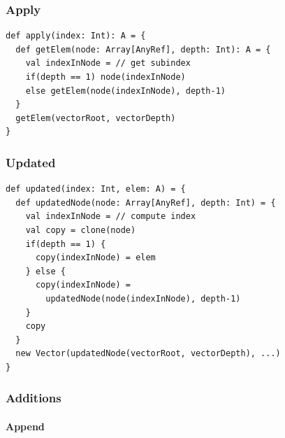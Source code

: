
\subsubsection{Apply}

\begin{lstlisting}[frame=single]
def apply(index: Int): A = {
  def getElem(node: Array[AnyRef], depth: Int): A = {
    val indexInNode = // get subindex
    if(depth == 1) node(indexInNode)
    else getElem(node(indexInNode), depth-1) 
  }
  getElem(vectorRoot, vectorDepth)
}
\end{lstlisting}


\subsubsection{Updated}

\begin{lstlisting}[frame=single]
def updated(index: Int, elem: A) = {
  def updatedNode(node: Array[AnyRef], depth: Int) = {
    val indexInNode = // compute index
    val copy = clone(node)
    if(depth == 1) {
      copy(indexInNode) = elem
    } else {
      copy(indexInNode) = 
        updatedNode(node(indexInNode), depth-1)
    }
    copy
  }
  new Vector(updatedNode(vectorRoot, vectorDepth), ...)
}
\end{lstlisting}


\subsubsection{Additions}

\paragraph{Append}

